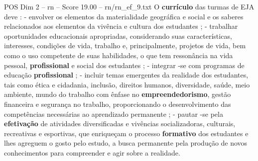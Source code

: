 \begin{textsample}{POS Dim 2 – rn – Score 19.00 – rn/rn\_ef\_9.txt}
O \textbf{currículo} das turmas de EJA deve : - envolver os elementos da materialidade geográfica e social e os saberes relacionados aos elementos da vivência e cultura dos estudantes ; - trabalhar oportunidades educacionais apropriadas, considerando suas características, interesses, condições de vida, trabalho e, principalmente, projetos de vida, bem como o uso competente de suas habilidades, o que tem ressonância na vida pessoal, \textbf{profissional} e social dos estudantes ; - integrar -se com programas de educação \textbf{profissional} ; - incluir temas emergentes da realidade dos estudantes, tais como ética e cidadania, inclusão, direitos humanos, diversidade, saúde, meio ambiente, mundo do trabalho com ênfase no \textbf{empreendedorismo}, gestão financeira e segurança no trabalho, proporcionando o desenvolvimento das competências necessárias ao aprendizado permanente ; - pautar -se pela \textbf{efetivação} de atividades diversificadas e vivências socializadoras, culturais, recreativas e esportivas, que enriqueçam o processo \textbf{formativo} dos estudantes e lhes agreguem o gosto pelo estudo, a busca permanente pela produção de novos conhecimentos para compreender e agir sobre a realidade.

\end{textsample}
